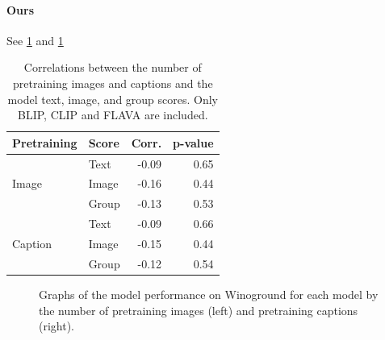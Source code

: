 \paragraph{Ours}

See \cref{tab:data-size-correlations-ours}  and \cref{fig:pretraining_images_ours}

\begin{table}[ht]
\centering
\begin{tabular}{llrr}
\toprule
Pretraining & Score & Corr. & p-value\\\midrule
               & Text    &  -0.09 &      0.65 \\
 Image              & Image   &  -0.16 &      0.44 \\
               & Group   &  -0.13 &      0.53 \\
             & Text    &  -0.09 &      0.66 \\
 Caption            & Image   &  -0.15 &      0.44 \\
             & Group   &  -0.12 &      0.54 \\
\bottomrule
\end{tabular}
\caption{Correlations between the number of pretraining images and captions and the model text, image, and group scores. Only BLIP, CLIP and FLAVA are included.}
\label{tab:data-size-correlations-ours}
\end{table}

\begin{figure}[ht]
    \centering
    \caption{Graphs of the model performance on Winoground for each model by the number of pretraining images (left) and pretraining captions (right).}
    \label{fig:pretraining_images_ours}
\end{figure}

\fi